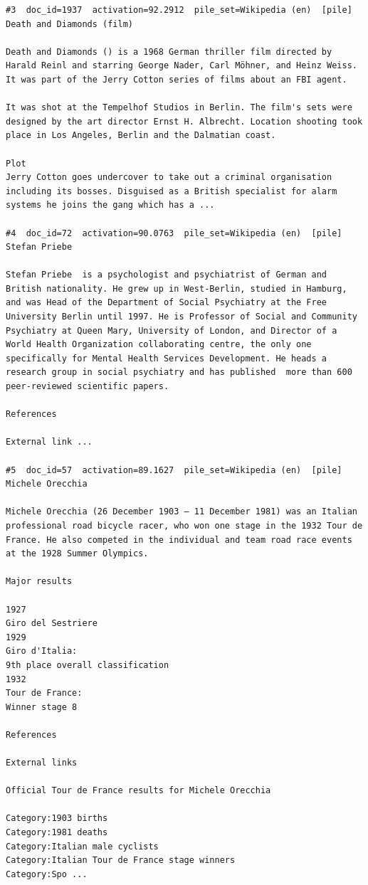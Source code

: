 \begin{verbatim}
#3  doc_id=1937  activation=92.2912  pile_set=Wikipedia (en)  [pile]
Death and Diamonds (film)

Death and Diamonds () is a 1968 German thriller film directed by Harald Reinl and starring George Nader, Carl Möhner, and Heinz Weiss. It was part of the Jerry Cotton series of films about an FBI agent.

It was shot at the Tempelhof Studios in Berlin. The film's sets were designed by the art director Ernst H. Albrecht. Location shooting took place in Los Angeles, Berlin and the Dalmatian coast.

Plot
Jerry Cotton goes undercover to take out a criminal organisation including its bosses. Disguised as a British specialist for alarm systems he joins the gang which has a ...

#4  doc_id=72  activation=90.0763  pile_set=Wikipedia (en)  [pile]
Stefan Priebe

Stefan Priebe  is a psychologist and psychiatrist of German and British nationality. He grew up in West-Berlin, studied in Hamburg, and was Head of the Department of Social Psychiatry at the Free University Berlin until 1997. He is Professor of Social and Community Psychiatry at Queen Mary, University of London, and Director of a World Health Organization collaborating centre, the only one specifically for Mental Health Services Development. He heads a research group in social psychiatry and has published  more than 600 peer-reviewed scientific papers.

References

External link ...

#5  doc_id=57  activation=89.1627  pile_set=Wikipedia (en)  [pile]
Michele Orecchia

Michele Orecchia (26 December 1903 – 11 December 1981) was an Italian professional road bicycle racer, who won one stage in the 1932 Tour de France. He also competed in the individual and team road race events at the 1928 Summer Olympics.

Major results

1927
Giro del Sestriere
1929
Giro d'Italia:
9th place overall classification
1932
Tour de France:
Winner stage 8

References

External links

Official Tour de France results for Michele Orecchia

Category:1903 births
Category:1981 deaths
Category:Italian male cyclists
Category:Italian Tour de France stage winners
Category:Spo ...


\end{verbatim}
